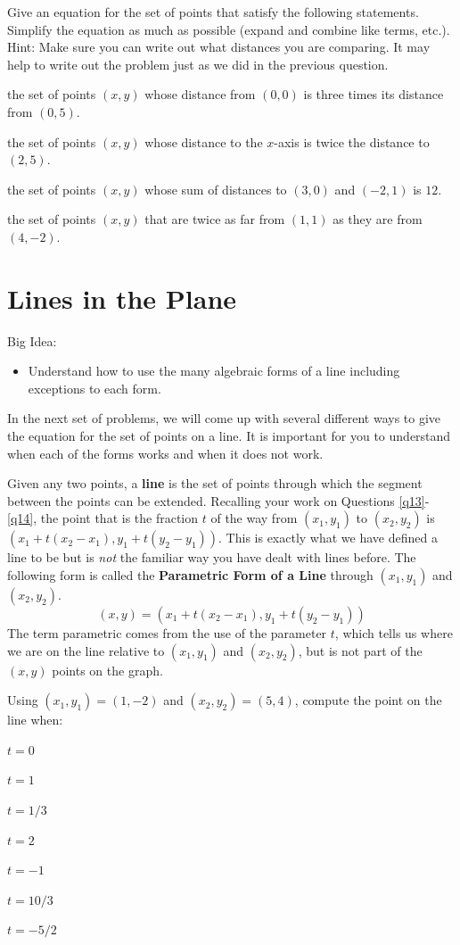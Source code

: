 \bq Give an equation for the set of points that satisfy the following statements. Simplify the equation as much as possible (expand and combine like terms, etc.). Hint: Make sure you can write out what distances you are comparing. It may help to write out the problem just as we did in the previous question.
\be
\item the set of points $(x,y)$ whose distance from $(0,0)$ is three times its distance from $(0,5)$.
\item the set of points $(x,y)$ whose distance to the $x$-axis is twice the distance to $(2,5)$.
\item the set of points $(x,y)$ whose sum of distances to $(3,0)$ and $(-2,1)$ is $12$.
\item the set of points $(x,y)$ that are twice as far from $(1,1)$ as they are from $(4,-2)$.
\ee
\eq

\section{Lines in the Plane}
Big Idea:
\begin{itemize}
\item Understand how to use the many algebraic forms of a line including exceptions to each form.
\end{itemize}
In the next set of problems, we will come up with several different ways to give the equation for the set of points on a line. It is important for you to understand when each of the forms works and when it does not work.
\begin{info} Given any two points, a \textbf{line} is the set of points through which the segment between the points can be extended.
Recalling your work on Questions \ref{q13}-\ref{q14}, the point that is the fraction $t$ of the way from $(x_1,y_1)$ to $(x_2,y_2)$ is $(x_1+t(x_2-x_1),y_1+t(y_2-y_1))$. This is exactly what we have defined a line to be but is \emph{not} the familiar way you have dealt with lines before. The following form is called the \textbf{Parametric Form of a Line} through $(x_1,y_1)$ and $(x_2,y_2)$. $$(x,y)=(x_1+t(x_2-x_1),y_1+t(y_2-y_1))$$
The term parametric comes from the use of the parameter $t$, which tells us where we are on the line relative to $(x_1,y_1)$ and $(x_2,y_2)$, but is not part of the $(x,y)$ points on the graph.
\end{info}

\bq\label{qp} Using $(x_1,y_1)=(1,-2)$ and $(x_2,y_2) = (5,4)$, compute the point on the line when:
\be
\item $t=0$
\item $t=1$
\item $t=1/3$
\item $t=2$
\item $t=-1$
\item $t=10/3$
\item $t=-5/2$
\ee
\eq

